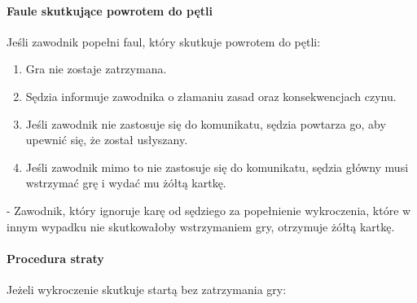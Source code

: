 \documentclass[12pt]{article}
\newcommand\yellowcard{\bgroup\color{yellow}\markoverwith{\textcolor{yellow}{\rule[-0.5ex]{2pt}{0.4pt}}}\ULon}
\begin{document}
\paragraph{Faule skutkujące powrotem do pętli}
Jeśli zawodnik
popełni faul, który skutkuje powrotem do pętli:

\begin{enumerate}
	\item
	      Gra nie zostaje zatrzymana.
	\item
	      Sędzia informuje zawodnika o złamaniu zasad oraz konsekwencjach czynu.
	\item
	      Jeśli zawodnik nie zastosuje się do komunikatu, sędzia powtarza go,
	      aby upewnić się, że został usłyszany.
	\item
	      Jeśli zawodnik mimo to nie zastosuje się do komunikatu, sędzia główny
	      musi wstrzymać grę i wydać mu żółtą kartkę.
\end{enumerate}

\yellowcard{Żółta kartka} - Zawodnik, który ignoruje karę od sędziego za
popełnienie wykroczenia, które w innym wypadku nie skutkowałoby
wstrzymaniem gry, otrzymuje żółtą kartkę.

\paragraph{Procedura straty}
Jeżeli wykroczenie skutkuje startą
bez zatrzymania gry:
\end{document}
